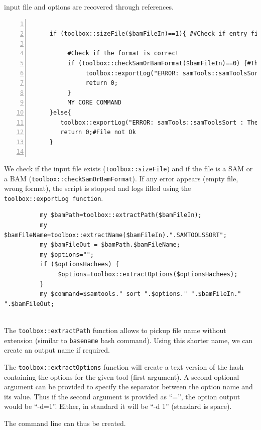 \documentclass[a4paper,10pt]{report}
\begin{document}
input file and options are recovered through references.

\begin{lstlisting}[numbers=left]

     if (toolbox::sizeFile($bamFileIn)==1){ ##Check if entry file exist and is not empty
          
          #Check if the format is correct
          if (toolbox::checkSamOrBamFormat($bamFileIn)==0) {#The file is not a BAM/SAM file
               toolbox::exportLog("ERROR: samTools::samToolsSort : The file $bamFileIn is not a SAM/BAM file\n",0);
               return 0;
          }
          MY CORE COMMAND
     }else{
        toolbox::exportLog("ERROR: samTools::samToolsSort : The file $bamFileIn is uncorrect\n",0);
        return 0;#File not Ok
     }
          

\end{lstlisting}

We check if the  input file exists (\texttt{toolbox::sizeFile}) and if the file is a SAM or a BAM (\texttt{toolbox::checkSamOrBamFormat}).
If any error appears (empty file, wrong format), the script is stopped and logs filled using the \texttt{toolbox::exportLog function}.

\begin{lstlisting}
          my $bamPath=toolbox::extractPath($bamFileIn);
          my $bamFileName=toolbox::extractName($bamFileIn).".SAMTOOLSSORT";
          my $bamFileOut = $bamPath.$bamFileName;
          my $options="";
          if ($optionsHachees) {
               $options=toolbox::extractOptions($optionsHachees);
          }
          my $command=$samtools." sort ".$options." ".$bamFileIn." ".$bamFileOut;
          
\end{lstlisting}

The \texttt{toolbox::extractPath} function allows to pickup file name without extension (similar to \texttt{basename} bash command). Using this shorter name, we can create an output name if required.

The \texttt{toolbox::extractOptions} function will create a text version of the hash containing the options for the given tool (first argument). A second optional argument can be provided to specify the separator between the option name and its value. Thus if the second argument is provided as ``='', the option output would be ``-d=1''. Either, in standard it will be ``-d 1'' (standard is space).

The command line can thus be created.
\end{document}
